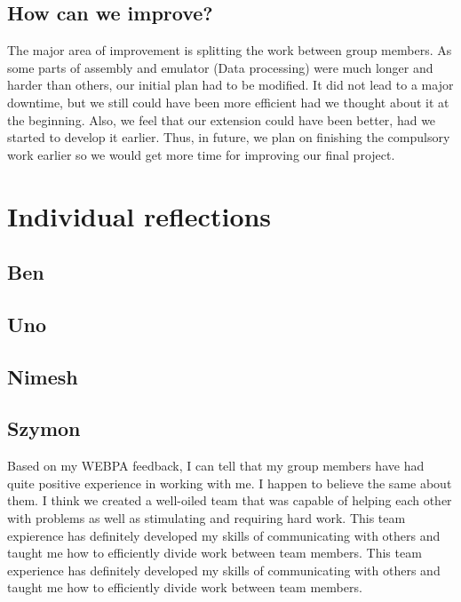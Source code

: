 \documentclass[11pt]{article}
\begin{document}
\subsection{How can we improve?}
The major area of improvement is splitting the work between group members. As some parts of assembly and emulator (Data processing) were much longer and harder than others, our initial plan had to be modified. It did not lead to a major downtime, but we still could have been more efficient had we thought about it at the beginning. Also, we feel that our extension could have been better, had we started to develop it earlier. Thus, in future, we plan on finishing the compulsory work earlier so we would get more time for improving our final project.
\section{Individual reflections}

\subsection{Ben}
\subsection{Uno}
\subsection{Nimesh}
\subsection{Szymon}
Based on my WEBPA feedback, I can tell that my group members have had quite positive experience in working with me. I happen to believe the same about them. I think we created a well-oiled team that was capable of helping each other with problems as well as stimulating and requiring hard work. This team expierence has definitely developed my skills of communicating with others and taught me how to efficiently divide work between team members. This team experience has definitely developed my skills of communicating with others and taught me how to efficiently divide work between team members.
\end{document}
